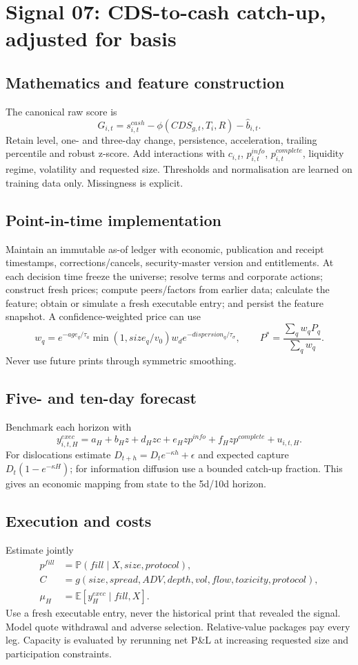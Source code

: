 \documentclass[10pt]{article}
\newcommand{\E}{\mathbb{E}}\newcommand{\Pp}{\mathbb{P}}
\begin{document}
\section{Signal 07: CDS-to-cash catch-up, adjusted for basis}
\subsection{Mathematics and feature construction}
The canonical raw score is
\begin{equation}G_{i,t}=s^{cash}_{i,t}-\phi(CDS_{g,t},T_i,R)-\widehat b_{i,t}.\end{equation}
Retain level, one- and three-day change, persistence, acceleration, trailing percentile and robust z-score. Add interactions with $c_{i,t}$, $p^{info}_{i,t}$, $p^{complete}_{i,t}$, liquidity regime, volatility and requested size. Thresholds and normalisation are learned on training data only. Missingness is explicit.

\subsection{Point-in-time implementation}
Maintain an immutable as-of ledger with economic, publication and receipt timestamps, corrections/cancels, security-master version and entitlements. At each decision time freeze the universe; resolve terms and corporate actions; construct fresh prices; compute peers/factors from earlier data; calculate the feature; obtain or simulate a fresh executable entry; and persist the feature snapshot. A confidence-weighted price can use
\[w_q=e^{-age_q/\tau_a}\min(1,size_q/v_0)w_d e^{-dispersion_q/\tau_\sigma},\qquad P^*=\frac{\sum_qw_qP_q}{\sum_qw_q}.\]
Never use future prints through symmetric smoothing.

\subsection{Five- and ten-day forecast}
Benchmark each horizon with
\[y^{exec}_{i,t,H}=a_H+b_Hz+d_Hzc+e_Hzp^{info}+f_Hzp^{complete}+u_{i,t,H}.\]
For dislocations estimate $D_{t+h}=D_te^{-\kappa h}+\epsilon$ and expected capture $D_t(1-e^{-\kappa H})$; for information diffusion use a bounded catch-up fraction. This gives an economic mapping from state to the 5d/10d horizon.

\subsection{Execution and costs}
Estimate jointly
\begin{align}
p^{fill}&=\Pp(fill\mid X,size,protocol),\\
C&=g(size,spread,ADV,depth,vol,flow,toxicity,protocol),\\
\mu_H&=\E[y^{exec}_H\mid fill,X].
\end{align}
Use a fresh executable entry, never the historical print that revealed the signal. Model quote withdrawal and adverse selection. Relative-value packages pay every leg. Capacity is evaluated by rerunning net P\&L at increasing requested size and participation constraints.
\end{document}
